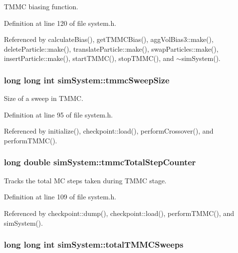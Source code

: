 T\-M\-M\-C biasing function. 



Definition at line 120 of file system.\-h.



Referenced by calculate\-Bias(), get\-T\-M\-M\-C\-Bias(), agg\-Vol\-Bias3\-::make(), delete\-Particle\-::make(), translate\-Particle\-::make(), swap\-Particles\-::make(), insert\-Particle\-::make(), start\-T\-M\-M\-C(), stop\-T\-M\-M\-C(), and $\sim$sim\-System().

\hypertarget{classsim_system_a56e284a361964d0a9ce5c45f41d56ab1}{
\subsubsection[{tmmc\-Sweep\-Size}]{\setlength{\rightskip}{0pt plus 5cm}long long int sim\-System\-::tmmc\-Sweep\-Size}}\label{classsim_system_a56e284a361964d0a9ce5c45f41d56ab1}


Size of a sweep in T\-M\-M\-C. 



Definition at line 95 of file system.\-h.



Referenced by initialize(), checkpoint\-::load(), perform\-Crossover(), and perform\-T\-M\-M\-C().

\hypertarget{classsim_system_a3ca5ff86766ab388bfd7a48605b10e17}{
\subsubsection[{tmmc\-Total\-Step\-Counter}]{\setlength{\rightskip}{0pt plus 5cm}long double sim\-System\-::tmmc\-Total\-Step\-Counter}}\label{classsim_system_a3ca5ff86766ab388bfd7a48605b10e17}


Tracks the total M\-C steps taken during T\-M\-M\-C stage. 



Definition at line 109 of file system.\-h.



Referenced by checkpoint\-::dump(), checkpoint\-::load(), perform\-T\-M\-M\-C(), and sim\-System().

\hypertarget{classsim_system_a78b107e20bcbf2f818264fa076de5db3}{
\subsubsection[{total\-T\-M\-M\-C\-Sweeps}]{\setlength{\rightskip}{0pt plus 5cm}long long int sim\-System\-::total\-T\-M\-M\-C\-Sweeps}}\label{classsim_system_a78b107e20bcbf2f818264fa076de5db3}


